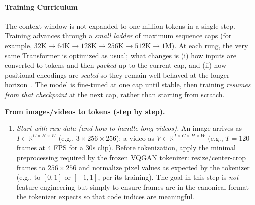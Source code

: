 \begin{enrichment}
\begin{enrichment}
        \newpage
        
        \paragraph{Training Curriculum}
        \label{enr:subsubsec_chapter24_lwm_training}
        
        The context window is not expanded to one million tokens in a single step. Training advances through a \emph{small ladder} of maximum sequence caps (for example, \(32\mathrm{K}\rightarrow 64\mathrm{K}\rightarrow 128\mathrm{K}\rightarrow 256\mathrm{K}\rightarrow 512\mathrm{K}\rightarrow 1\mathrm{M}\)). At each rung, the very same Transformer is optimized as usual; what changes is (i) how inputs are converted to tokens and then \emph{packed} up to the current cap, and (ii) how positional encodings are \emph{scaled} so they remain well behaved at the longer horizon~\cite[Sec.~3.1]{liu2025_lwm}. The model is fine-tuned at one cap until stable, then training \emph{resumes from that checkpoint} at the next cap, rather than starting from scratch.
        
        \medskip
        \noindent\textbf{From images/videos to tokens (step by step).}
        \begin{enumerate}
            \item \textit{Start with raw data (and how to handle long videos).} 
            An image arrives as \(I \in \mathbb{R}^{C\times H\times W}\) (e.g., \(3\times256\times256\)); a video as \(V \in \mathbb{R}^{T\times C\times H\times W}\) (e.g., \(T{=}120\) frames at \(4\) FPS for a \(30\)s clip). Before tokenization, apply the minimal preprocessing required by the frozen VQGAN tokenizer: resize/center-crop frames to \(256{\times}256\) and normalize pixel values as expected by the tokenizer (e.g., to \([0,1]\) or \([-1,1]\), per its training). The goal in this step is \emph{not} feature engineering but simply to ensure frames are in the canonical format the tokenizer expects so that code indices are meaningful.
            

\end{enumerate}
\end{enrichment}
\end{enrichment}
